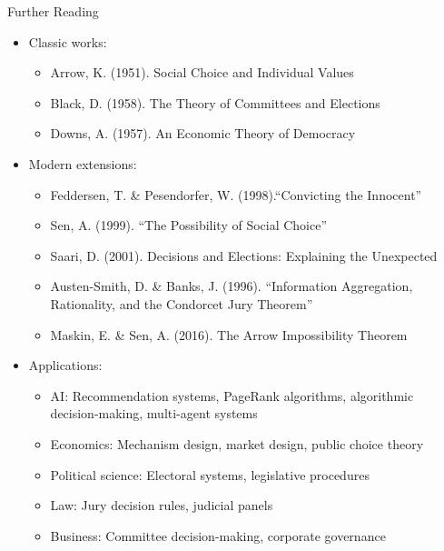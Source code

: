 \documentclass[10pt]{beamer}
\begin{document}
\begin{frame}{Further Reading}
  \begin{itemize}[<+->]
    \item Classic works:
      \begin{itemize}
        \item Arrow, K. (1951). Social Choice and Individual Values
        \item Black, D. (1958). The Theory of Committees and Elections
        \item Downs, A. (1957). An Economic Theory of Democracy
      \end{itemize}
    \item Modern extensions:
      \begin{itemize}
        \item Feddersen, T. \& Pesendorfer, W. (1998).``Convicting the Innocent''
        \item Sen, A. (1999). ``The Possibility of Social Choice''
        \item Saari, D. (2001). Decisions and Elections: Explaining the Unexpected
        \item Austen-Smith, D. \& Banks, J. (1996). ``Information Aggregation, Rationality, and the Condorcet Jury Theorem''
        \item Maskin, E. \& Sen, A. (2016). The Arrow Impossibility Theorem
      \end{itemize}
    \item Applications:
      \begin{itemize}
        \item AI: Recommendation systems, PageRank algorithms, algorithmic decision-making, multi-agent systems
        \item Economics: Mechanism design, market design, public choice theory
        \item Political science: Electoral systems, legislative procedures
        \item Law: Jury decision rules, judicial panels
        \item Business: Committee decision-making, corporate governance
      \end{itemize}
  \end{itemize}
\end{frame}
\end{document}
